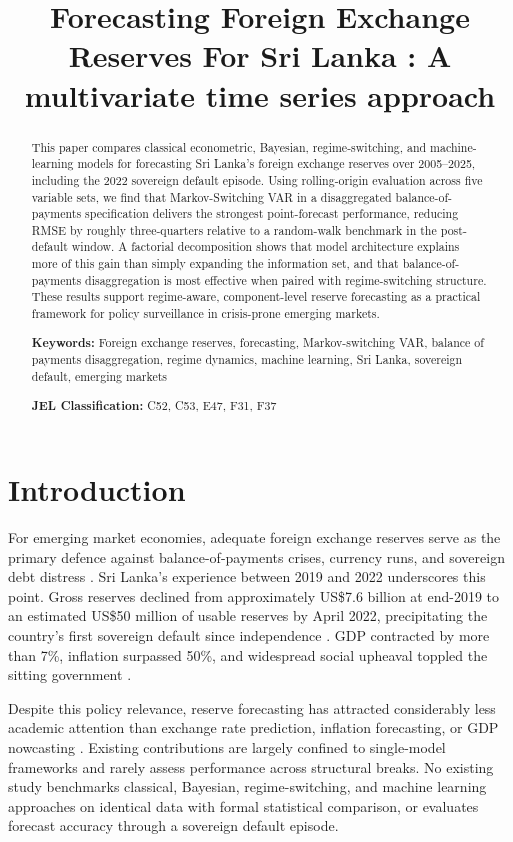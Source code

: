 \documentclass[12pt,a4paper]{article}
\title{Forecasting Foreign Exchange Reserves For Sri Lanka : A multivariate time series approach}
\author{}
\date{}
\begin{document}
\maketitle

\begin{abstract}
This paper compares classical econometric, Bayesian, regime-switching, and machine-learning models for forecasting Sri Lanka's foreign exchange reserves over 2005--2025, including the 2022 sovereign default episode. Using rolling-origin evaluation across five variable sets, we find that Markov-Switching VAR in a disaggregated balance-of-payments specification delivers the strongest point-forecast performance, reducing RMSE by roughly three-quarters relative to a random-walk benchmark in the post-default window. A factorial decomposition shows that model architecture explains more of this gain than simply expanding the information set, and that balance-of-payments disaggregation is most effective when paired with regime-switching structure. These results support regime-aware, component-level reserve forecasting as a practical framework for policy surveillance in crisis-prone emerging markets.

\noindent\textbf{Keywords:} Foreign exchange reserves, forecasting, Markov-switching VAR, balance of payments disaggregation, regime dynamics, machine learning, Sri Lanka, sovereign default, emerging markets

\noindent\textbf{JEL Classification:} C52, C53, E47, F31, F37
\end{abstract}

\section{Introduction}

For emerging market economies, adequate foreign exchange reserves serve as the primary defence against balance-of-payments crises, currency runs, and sovereign debt distress \citep{JeanneRanciere2011}. Sri Lanka's experience between 2019 and 2022 underscores this point. Gross reserves declined from approximately US\$7.6 billion at end-2019 to an estimated US\$50 million of usable reserves by April 2022, precipitating the country's first sovereign default since independence \citep{Athukorala2024}. GDP contracted by more than 7\%, inflation surpassed 50\%, and widespread social upheaval toppled the sitting government \citep{Weerakoon2023}.

Despite this policy relevance, reserve forecasting has attracted considerably less academic attention than exchange rate prediction, inflation forecasting, or GDP nowcasting \citep{Rossi2013}. Existing contributions are largely confined to single-model frameworks \citep{SehgalSharma2008,Gosselin2005} and rarely assess performance across structural breaks. No existing study benchmarks classical, Bayesian, regime-switching, and machine learning approaches on identical data with formal statistical comparison, or evaluates forecast accuracy through a sovereign default episode.
\end{document}
